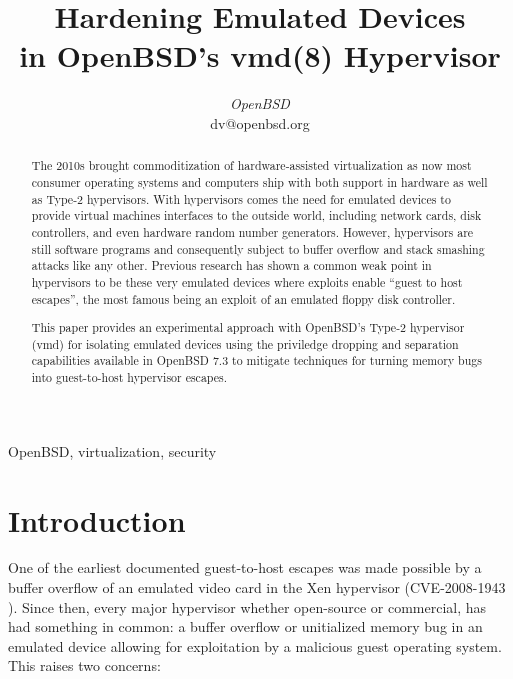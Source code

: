 \documentclass[conference]{IEEEtran}
\begin{document}
\title{Hardening Emulated Devices \\ in OpenBSD's vmd(8) Hypervisor}

\author{
\textit{OpenBSD}\\
dv@openbsd.org}

\maketitle

\begin{abstract}
The 2010s brought commoditization of hardware-assisted virtualization
as now most consumer operating systems and computers ship with both
support in hardware as well as Type-2 hypervisors. With hypervisors
comes the need for emulated devices to provide virtual machines
interfaces to the outside world, including network cards, disk
controllers, and even hardware random number generators. However,
hypervisors are still software programs and consequently subject to
buffer overflow and stack smashing attacks like any other. Previous
research has shown a common weak point in hypervisors to be these very
emulated devices where exploits enable ``guest to host escapes'', the
most famous being an exploit of an emulated floppy disk controller.

This paper provides an experimental approach with OpenBSD's Type-2
hypervisor (vmd) for isolating emulated devices using the priviledge
dropping and separation capabilities available in OpenBSD 7.3 to
mitigate techniques for turning memory bugs into guest-to-host
hypervisor escapes.
\end{abstract}


\begin{IEEEkeywords}
OpenBSD, virtualization, security
\end{IEEEkeywords}

\vspace{5mm}
\section{Introduction}
One of the earliest documented guest-to-host escapes was made possible
by a buffer overflow of an emulated video card in the Xen hypervisor
(CVE-2008-1943 \cite{b1}). Since then, every major hypervisor whether
open-source or commercial, has had something in common: a buffer
overflow or unitialized memory bug in an emulated device allowing for
exploitation by a malicious guest operating system. This raises two
concerns:
\end{document}
